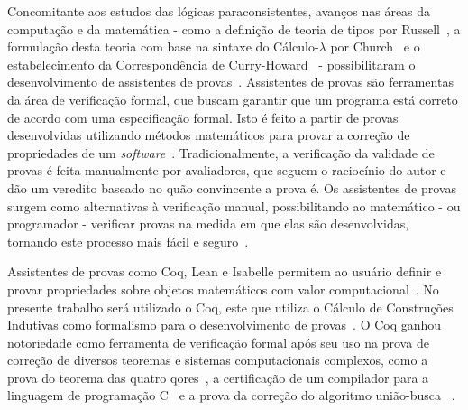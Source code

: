 Concomitante aos estudos das lógicas paraconsistentes, avanços nas áreas da computação e da matemática {-} como a definição de teoria de tipos por Russell~\cite{russell1903principles,Russell1908-RUSMLA}, a formulação desta teoria com base na sintaxe do Cálculo-$\lambda$ por Church~\cite{church1940formulation} e o estabelecimento  da Correspondência de Curry-Howard~\cite{curry1958combinatory,howard1980formulae} {-} possibilitaram o desenvolvimento de assistentes de provas~\cite{harrison2014history}. Assistentes de provas são ferramentas da área de verificação formal, que buscam garantir que um programa está correto de acordo com uma especificação formal. Isto é feito a partir de provas desenvolvidas utilizando métodos matemáticos para provar  a correção de propriedades de um \textit{software}~\cite{Chlipala_2013}. Tradicionalmente, a verificação da validade de provas é feita manualmente por avaliadores, que seguem o raciocínio do autor e dão um veredito baseado no quão convincente a prova é. Os assistentes de provas surgem como alternativas à verificação manual, possibilitando ao matemático {-} ou programador {-} verificar provas na medida em que elas são desenvolvidas, tornando este processo mais fácil e seguro~\cite{paulinmohring:hal-01094195}.

Assistentes de provas como Coq, Lean e Isabelle permitem ao usuário definir e provar propriedades sobre objetos matemáticos com valor computacional~\cite{geuvers2009proof}. No presente trabalho será utilizado o Coq, este que utiliza o Cálculo de Construções Indutivas como formalismo para o desenvolvimento de provas~\cite{TEAM_2024}. O Coq ganhou notoriedade como ferramenta de verificação formal após seu uso na prova de correção de diversos teoremas e sistemas computacionais complexos, como a prova do teorema das quatro qores~\cite{geuvers2009proof}, a certificação de um compilador para a linguagem de programação C~\cite{leroy2021compcert} e a prova da correção do algoritmo união-busca~\cite{union-find} .

